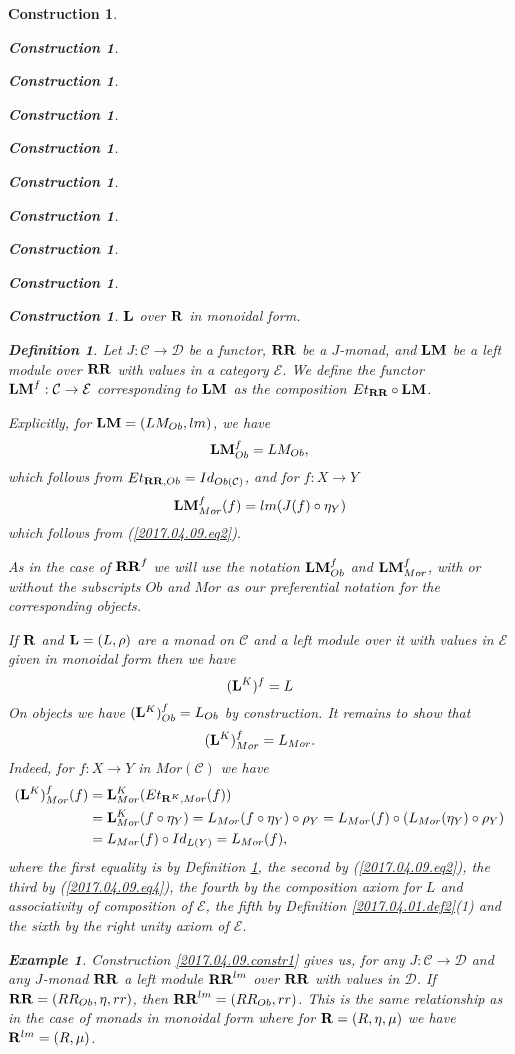 \documentclass[onecolumn,12pt]{amsart}
\newtheorem{definition}[proposition]{Definition}
\newtheorem{example}[proposition]{Example}
\numberwithin{proposition}{subsection}
\newtheorem{construction}[proposition]{Construction}
\newcommand{\sr}{\rightarrow}
\newcommand{\R}{{\bf R}}
\newcommand{\RR}{{\bf RR}}
\newcommand{\LM}{{\bf LM}}
\newcommand{\C}{{\mathcal C}}
\newcommand{\D}{{\mathcal D}}
\newcommand{\E}{{\mathcal E}}
\begin{document}
\begin{construction}
\begin{construction}
\begin{construction}
\begin{construction}
\begin{construction}
\begin{construction}
\begin{construction}
\begin{construction}
\begin{construction}
\begin{construction}
${\bf L}$ over $\R$ in monoidal form.
%
\begin{definition}
\label{2017.04.05.def1} 
Let $J:\C\sr\D$ be a functor, $\RR$ be a $J$-monad, and
$\LM$ be a left module over $\RR$ with values in a category $\E$. We define the
functor $\LM^f:\C\sr \E$ corresponding to $\LM$ as the composition
$Et_{\RR}\circ \LM$.
\end{definition}
%
Explicitly, for $\LM=(LM_{Ob},lm)$, we have
%
$$\LM^f_{Ob}=LM_{Ob},$$
%
which follows from $Et_{\RR,Ob}=Id_{Ob(\C)}$, and for $f:X\sr Y$ 
%
\begin{equation}\label{2017.04.11.eq5}
\LM^f_{Mor}(f)=lm(J(f)\circ \eta_{Y})
\end{equation}%
%
which follows from (\ref{2017.04.09.eq2}). 

As in the case of $\RR^f$ we will use the notation $\LM^f_{Ob}$ and
$\LM^f_{Mor}$, with or without the subscripts $Ob$ and $Mor$ as our
preferential notation for the corresponding objects.

If $\R$ and ${\bf L}=(L,\rho)$ are a monad on $\C$ and a left module over it
with values in $\E$ given in monoidal form then we have
%
\begin{equation}
\label{2017.04.17.eq4}
({\bf L}^K)^f=L
\end{equation}%
%
On objects we have $({\bf L}^K)^f_{Ob}=L_{Ob}$ by construction. It remains to
show that
%
\begin{equation}\label{2017.04.09.eq1}
({\bf L}^K)^f_{Mor}=L_{Mor}.
\end{equation}%
%
Indeed, for $f:X\sr Y$ in $Mor(\C)$ we have
%
\begin{equation*}
  \begin{split}
    ({\bf L}^K)^f_{Mor}(f) &= {\bf L}^K_{Mor}(Et_{\R^K,Mor}(f))
    \\
    &= {\bf L}^K_{Mor}(f\circ \eta_Y)=L_{Mor}(f\circ \eta_Y)\circ \rho_Y=L_{Mor}(f)\circ (L_{Mor}(\eta_Y)\circ \rho_Y)
    \\
    &= L_{Mor}(f)\circ Id_{L(Y)}=L_{Mor}(f),
  \end{split}
\end{equation*}
%
where the first equality is by Definition \ref{2017.04.05.def1}, the second by
(\ref{2017.04.09.eq2}), the third by (\ref{2017.04.09.eq4}), the fourth by the
composition axiom for $L$ and associativity of composition of $\E$, the fifth
by Definition \ref{2017.04.01.def2}(1) and the sixth by the right unity axiom
of $\E$.
%
\begin{example}\rm
\label{2017.04.15.ex2}
Construction \ref{2017.04.09.constr1} gives us, for any $J:\C\sr \D$ and any
$J$-monad $\RR$ a left module $\RR^{lm}$ over $\RR$ with values in $\D$.  If
$\RR=(RR_{Ob},\eta,rr)$, then $\RR^{lm}=(RR_{Ob},rr)$. This is the same
relationship as in the case of monads in monoidal form where for
$\R=(R,\eta,\mu)$ we have $\R^{lm}=(R,\mu)$.


\end{example}
\end{construction}
\end{construction}
\end{construction}
\end{construction}
\end{construction}
\end{construction}
\end{construction}
\end{construction}
\end{construction}
\end{construction}
\end{document}
